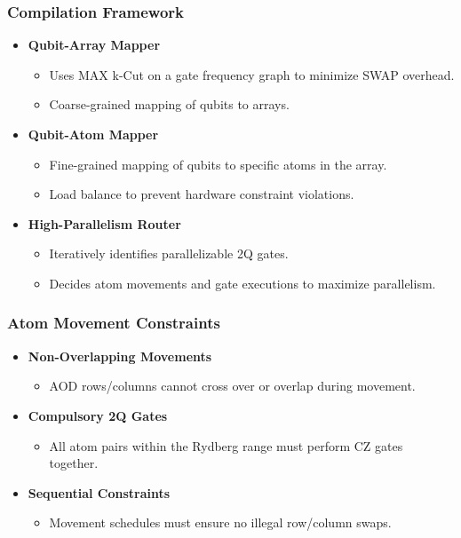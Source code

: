 \documentclass[18 pt]{beamer}
\begin{document}
\begin{frame}
    \frametitle{Compilation Framework}
    \begin{itemize}
        \item \textbf{Qubit-Array Mapper}
        \begin{itemize}
            \item Uses MAX k-Cut on a gate frequency graph to minimize SWAP overhead.
            \item Coarse-grained mapping of qubits to arrays.
        \end{itemize}
        \item \textbf{Qubit-Atom Mapper}
        \begin{itemize}
            \item Fine-grained mapping of qubits to specific atoms in the array.
            \item Load balance to prevent hardware constraint violations.
        \end{itemize}
        \item \textbf{High-Parallelism Router}
        \begin{itemize}
            \item Iteratively identifies parallelizable 2Q gates.
            \item Decides atom movements and gate executions to maximize parallelism.
        \end{itemize}
    \end{itemize}
\end{frame}

\begin{frame}
    \frametitle{Atom Movement Constraints}
    \begin{itemize}
        \item \textbf{Non-Overlapping Movements}
        \begin{itemize}
            \item AOD rows/columns cannot cross over or overlap during movement.
        \end{itemize}
        \item \textbf{Compulsory 2Q Gates}
        \begin{itemize}
            \item All atom pairs within the Rydberg range must perform CZ gates together.
        \end{itemize}
        \item \textbf{Sequential Constraints}
        \begin{itemize}
            \item Movement schedules must ensure no illegal row/column swaps.
        \end{itemize}
    \end{itemize}
\end{frame}
\end{document}
